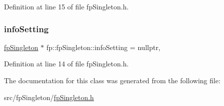 Definition at line 15 of file fp\+Singleton.\+h.

\mbox{\label{classfp_1_1fpSingleton_a0e2c02e7e7f730f59e5c1f10005d581c}} 
\subsubsection{\texorpdfstring{info\+Setting}{infoSetting}}
{\footnotesize\ttfamily \hyperlink{classfp_1_1fpSingleton}{fp\+Singleton} $\ast$ fp\+::fp\+Singleton\+::info\+Setting = nullptr\hspace{0.3cm}{\ttfamily [static]}, {\ttfamily [private]}}



Definition at line 14 of file fp\+Singleton.\+h.



The documentation for this class was generated from the following file\+:\begin{DoxyCompactItemize}
\item 
src/fp\+Singleton/\hyperlink{fpSingleton_8h}{fp\+Singleton.\+h}\end{DoxyCompactItemize}

